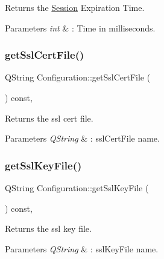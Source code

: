 Returns the \hyperlink{class_session}{Session} Expiration Time. 


\begin{DoxyParams}{Parameters}
{\em int} & \+: Time in milliseconds. \\
\hline
\end{DoxyParams}
\mbox{\label{class_configuration_a7d58b7b13992eb1ce0789b9442ff663c}} 
\subsubsection{\texorpdfstring{get\+Ssl\+Cert\+File()}{getSslCertFile()}}
{\footnotesize\ttfamily Q\+String Configuration\+::get\+Ssl\+Cert\+File (\begin{DoxyParamCaption}{ }\end{DoxyParamCaption}) const\hspace{0.3cm}{\ttfamily [inline]}, {\ttfamily [noexcept]}}



Returns the ssl cert file. 


\begin{DoxyParams}{Parameters}
{\em Q\+String} & \+: ssl\+Cert\+File name. \\
\hline
\end{DoxyParams}
\mbox{\label{class_configuration_aff6b12e5b77552fb0feb9f9598335049}} 
\subsubsection{\texorpdfstring{get\+Ssl\+Key\+File()}{getSslKeyFile()}}
{\footnotesize\ttfamily Q\+String Configuration\+::get\+Ssl\+Key\+File (\begin{DoxyParamCaption}{ }\end{DoxyParamCaption}) const\hspace{0.3cm}{\ttfamily [inline]}, {\ttfamily [noexcept]}}



Returns the ssl key file. 


\begin{DoxyParams}{Parameters}
{\em Q\+String} & \+: ssl\+Key\+File name. \\
\hline
\end{DoxyParams}
\mbox{\label{class_configuration_ab39a76ac734b52df96c9c07f71764ae2}} 
